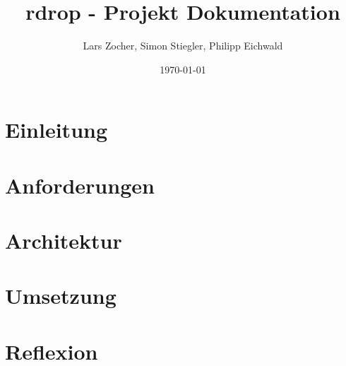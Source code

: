 \documentclass{article}
\title{rdrop - Projekt Dokumentation}
\author{Lars Zocher, Simon Stiegler, Philipp Eichwald}
\date{\today}
\begin{document}
\maketitle

\section{Einleitung}


\section{Anforderungen}


\section{Architektur}


\section{Umsetzung}


\section{Reflexion}


\printbibliography
\end{document}
